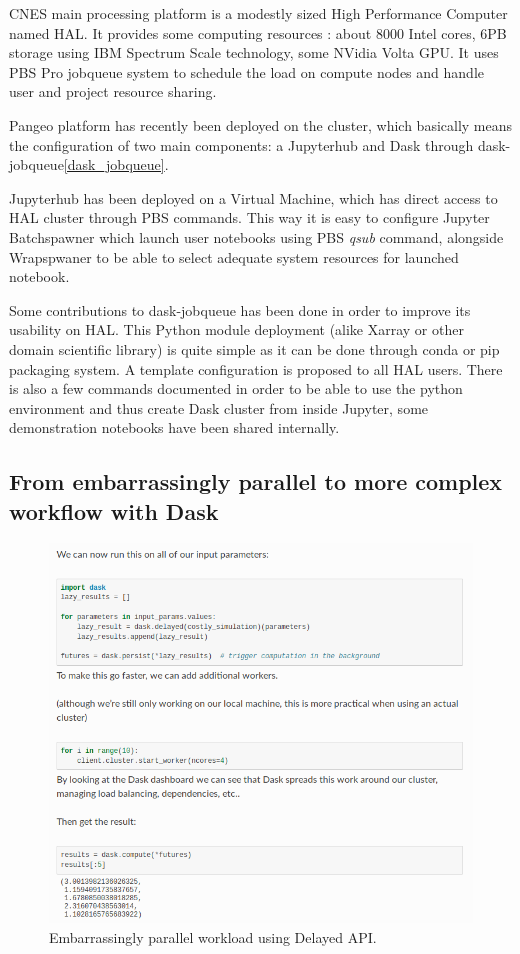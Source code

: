\documentclass{article}
\begin{document}
CNES main processing platform is a modestly sized High Performance Computer named HAL. It provides some computing resources : about 8000 Intel cores, 6PB storage using IBM Spectrum Scale technology, some NVidia Volta GPU. It uses PBS Pro jobqueue system to schedule the load on compute nodes and handle user and project resource sharing.

Pangeo platform has recently been deployed on the cluster, which basically means the configuration of two main components: a Jupyterhub and Dask through dask-jobqueue\ref{dask_jobqueue}.

Jupyterhub has been deployed on a Virtual Machine, which has direct access to HAL cluster through PBS commands. This way it is easy to configure Jupyter Batchspawner which launch user notebooks using PBS \textit{qsub} command, alongside Wrapspwaner to be able to select adequate system resources for launched notebook. 

Some contributions to dask-jobqueue has been done in order to improve its usability on HAL. This Python module deployment (alike Xarray or other domain scientific library) is quite simple as it can be done through conda or pip packaging system. A template configuration is proposed to all HAL users. There is also a few commands documented in order to be able to use the python environment and thus create Dask cluster from inside Jupyter, some demonstration notebooks have been shared internally.

\subsection{From embarrassingly parallel to more complex workflow with Dask}
\label{ssec:usecase1}

\begin{figure}
  \centering
  \includegraphics[width=\columnwidth]{ep_dask_code.png}
  \caption{\label{ep_dask_code} Embarrassingly parallel workload using Delayed API.}
\end{figure}
\end{document}
